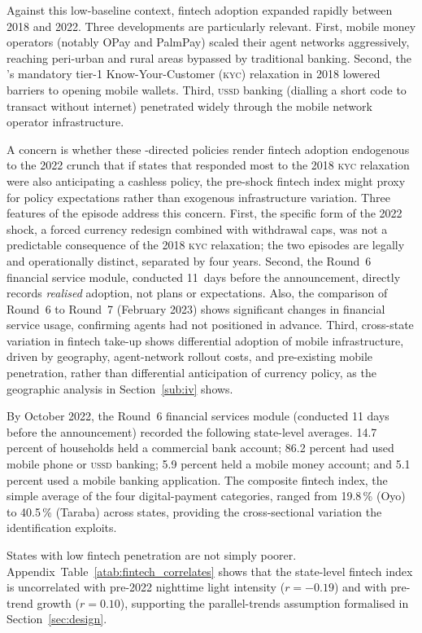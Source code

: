 Against this low-baseline context, fintech adoption expanded rapidly
between 2018 and 2022. Three developments are particularly relevant.
First, mobile money operators (notably OPay and PalmPay) scaled
their agent networks aggressively, reaching peri-urban and rural
areas bypassed by traditional banking. Second, the \CBN{}'s
mandatory tier-1 Know-Your-Customer (\textsc{kyc}) relaxation in 2018
lowered barriers to opening mobile wallets. Third, \textsc{ussd} banking
(dialling a short code to transact without internet) penetrated widely
through the mobile network operator infrastructure.

A concern is whether these \CBN{}-directed policies render fintech
adoption endogenous to the 2022 crunch that if states that responded most to
the 2018 \textsc{kyc} relaxation were also anticipating a cashless policy,
the pre-shock fintech index might proxy for policy expectations rather than
exogenous infrastructure variation. Three features of the episode address
this concern. First, the specific form of the 2022 shock, a forced currency
redesign combined with withdrawal caps, was not a predictable consequence of
the 2018 \textsc{kyc} relaxation; the two episodes are legally and operationally
distinct, separated by four years. Second, the \NLPS{} Round~6 financial
service module, conducted 11~days before the announcement, directly records
\emph{realised} adoption, not plans or expectations. Also, the comparison of
Round~6 to Round~7 (February 2023) shows significant changes in financial
service usage, confirming agents had not positioned in advance. Third,
cross-state variation in fintech take-up shows differential adoption of
mobile infrastructure, driven by geography, agent-network rollout costs, and
pre-existing mobile penetration, rather than differential anticipation of
currency policy, as the geographic analysis in Section~\ref{sub:iv} shows.

By October 2022, the \NLPS{} Round~6 financial services module
(conducted 11 days before the \CBN{} announcement) recorded the
following state-level averages. 14.7 percent of households held a
commercial bank account; 86.2 percent had used mobile phone or
\textsc{ussd} banking; 5.9 percent held a mobile money account;
and 5.1 percent used a mobile banking application. The composite
fintech index, the simple average of the four digital-payment
categories, ranged from 19.8\,\% (Oyo) to 40.5\,\% (Taraba) across
states, providing the cross-sectional variation the identification exploits.

States with low fintech penetration are not simply poorer.
Appendix~Table~\ref{atab:fintech_correlates} shows that the
state-level fintech index is uncorrelated with pre-2022
nighttime light intensity ($r = -0.19$) and with pre-trend \NTL{}
growth ($r = 0.10$), supporting the parallel-trends assumption
formalised in Section~\ref{sec:design}.
